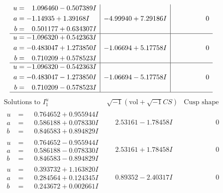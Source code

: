 \documentclass[1p]{elsarticle_modified}
\theoremstyle{definition}
\newcommand{\I}{\sqrt{-1}}
\begin{document}
$$\begin{array}{c|c|c}
\begin{aligned}
u &= \phantom{-}1.096460 - 0.507389 I \\
a &= -1.14935 + 1.39168 I \\
b &= \phantom{-}0.501177 + 0.634307 I\end{aligned}
 & -4.99940 + 7.29186 I & \phantom{-0.000000 } 0 \\ \hline\begin{aligned}
u &= -1.096320 + 0.542363 I \\
a &= -0.483047 + 1.273850 I \\
b &= \phantom{-}0.710209 + 0.578523 I\end{aligned}
 & -1.06694 + 5.17758 I & \phantom{-0.000000 } 0 \\ \hline\begin{aligned}
u &= -1.096320 - 0.542363 I \\
a &= -0.483047 - 1.273850 I \\
b &= \phantom{-}0.710209 - 0.578523 I\end{aligned}
 & -1.06694 - 5.17758 I & \phantom{-0.000000 } 0\\
 \hline 
 \end{array}$$\newpage$$\begin{array}{c|c|c}  
\text{Solutions to }I^u_{1}& \I (\text{vol} + \sqrt{-1}CS) & \text{Cusp shape}\\
 \hline 
\begin{aligned}
u &= \phantom{-}0.764652 + 0.955944 I \\
a &= \phantom{-}0.586188 + 0.078330 I \\
b &= \phantom{-}0.846583 + 0.894829 I\end{aligned}
 & \phantom{-}2.53161 - 1.78458 I & \phantom{-0.000000 } 0 \\ \hline\begin{aligned}
u &= \phantom{-}0.764652 - 0.955944 I \\
a &= \phantom{-}0.586188 - 0.078330 I \\
b &= \phantom{-}0.846583 - 0.894829 I\end{aligned}
 & \phantom{-}2.53161 + 1.78458 I & \phantom{-0.000000 } 0 \\ \hline\begin{aligned}
u &= \phantom{-}0.393732 + 1.163820 I \\
a &= \phantom{-}0.284564 + 0.124345 I \\
b &= \phantom{-}0.243672 + 0.002661 I\end{aligned}
 & \phantom{-}0.89352 - 2.40317 I & \phantom{-0.000000 } 0 \\ \hline\begin{aligned}

\end{aligned}
\end{array}$$
\end{document}
